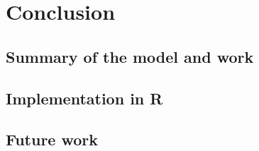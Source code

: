 \chapter{Conclusion} \label{Conclusion}

\section{Summary of the model and work}\label{Summary}

\section{Implementation in R}\label{ImplementationInR}

\section{Future work}\label{FutureWork}

